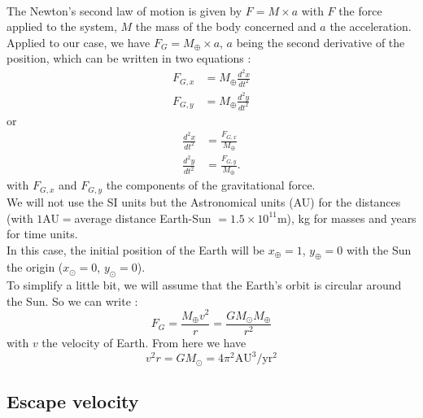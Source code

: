 \documentclass[a4paper, twoside, 11pt]{report}
\theoremstyle{theorem}
\theoremstyle{remark}
\theoremstyle{exemple}
\begin{document}
            \paragraph{}The Newton's second law of motion is given by $F=M \times a$ with $F$ the force applied to the system, $M$ the mass of the body concerned and $a$ the acceleration. Applied to our case, we have $F_G = M_{\oplus} \times a$, $a$ being the second derivative of the position, which can be written in two equations : 
                \begin{align*}
                    F_{G,x} &= M_{\oplus} \frac{d^2 x}{dt^2} \\
                    F_{G,y} &= M_{\oplus} \frac{d^2 y}{dt^2}
                \end{align*}
            or
                \begin{align}
                    \frac{d^2 x}{dt^2} &= \frac{F_{G,x}}{M_{\oplus}} \tag{1}\\
                    \frac{d^2 y}{dt^2} &= \frac{F_{G,y}}{M_{\oplus}} \tag{2}.
                \end{align}
            with $F_{G,x}$ and $F_{G,y}$ the components of the gravitational force.\\
            We will not use the SI units but the Astronomical units (AU) for the distances (with $1$AU$=$average distance Earth-Sun $=1.5 \times 10^{11}$m), kg for masses and years for time units. \\
            In this case, the initial position of the Earth will be $x_{\oplus} = 1$, \hspace{0,1cm}$y_{\oplus} = 0$ with the Sun the origin ($x_{\odot} = 0$, $y_{\odot} = 0$). \\
            To simplify a little bit, we will assume that the Earth's orbit is circular around the Sun. So we can write :
                \begin{equation}
                    F_G = \frac{M_{\oplus} v^2}{r} = \frac{GM_{\odot}M_{\oplus}}{r^2}
                    \tag{3}
                \end{equation}
            with $v$ the velocity of Earth. From here we have
                \begin{equation*}
                    v^2 r = GM_{\odot} = 4 \pi^2 \mathrm{AU}^3 / \mathrm{yr}^2
                    \tag{4}
                \end{equation*}
            
        \subsection{Escape velocity}
\end{document}
